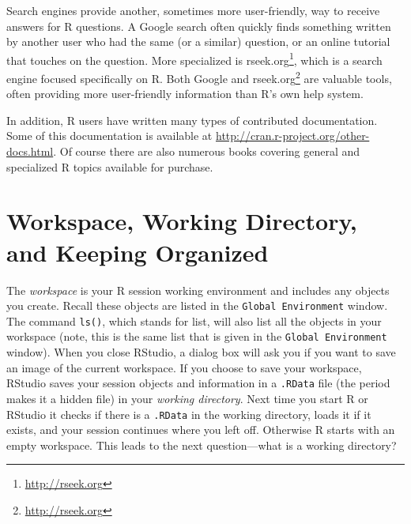 \documentclass[]{krantz}
\renewcommand{\href}[2]{#2\footnote{\url{#1}}}
\begin{document}
Search engines provide another, sometimes more user-friendly, way to
receive answers for R questions. A Google search often quickly finds
something written by another user who had the same (or a similar)
question, or an online tutorial that touches on the question. More
specialized is \href{http://rseek.org}{rseek.org}, which is a search
engine focused specifically on R. Both Google and
\href{http://rseek.org}{rseek.org} are valuable tools, often providing
more user-friendly information than R's own help system.

In addition, R users have written many types of contributed
documentation. Some of this documentation is available at
\url{http://cran.r-project.org/other-docs.html}. Of course there are
also numerous books covering general and specialized R topics available
for purchase.

\section{Workspace, Working Directory, and Keeping
Organized}\label{workspace-working-directory-and-keeping-organized}

The \emph{workspace} is your R session working environment and includes
any objects you create. Recall these objects are listed in the
\texttt{Global\ Environment} window. The command \texttt{ls()}, which
stands for list, will also list all the objects in your workspace (note,
this is the same list that is given in the \texttt{Global\ Environment}
window). When you close RStudio, a dialog box will ask you if you want
to save an image of the current workspace. If you choose to save your
workspace, RStudio saves your session objects and information in a
\texttt{.RData} file (the period makes it a hidden file) in your
\emph{working directory}. Next time you start R or RStudio it checks if
there is a \texttt{.RData} in the working directory, loads it if it
exists, and your session continues where you left off. Otherwise R
starts with an empty workspace. This leads to the next question---what
is a working directory?
\end{document}
